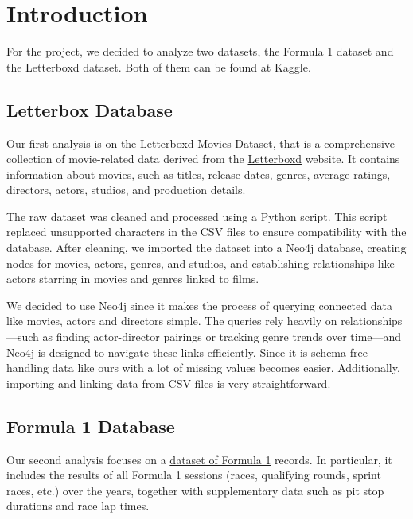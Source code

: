 \documentclass{Configuration_Files/PoliMi3i_thesis}
\begin{document}
\mainmatter %

\chapter{Introduction}

For the project, we decided to analyze two datasets, the Formula 1 dataset and the Letterboxd dataset. Both of them can be found at Kaggle.

\section{Letterbox Database}

Our first analysis is on the \href{https://www.kaggle.com/datasets/gsimonx37/letterboxd}{Letterboxd Movies Dataset}, that is a comprehensive collection of movie-related data derived from the \href{https://letterboxd.com/}{Letterboxd} website. It contains information about movies, such as titles, release dates, genres, average ratings, directors, actors, studios, and production details.

The raw dataset was cleaned and processed using a Python script. This script replaced unsupported characters in the CSV files to ensure compatibility with the database. After cleaning, we imported the dataset into a Neo4j database, creating nodes for movies, actors, genres, and studios, and establishing relationships like actors starring in movies and genres linked to films.

We decided to use Neo4j since it makes the process of querying connected data like movies, actors and directors simple. The queries rely heavily on relationships—such as finding actor-director pairings or tracking genre trends over time—and Neo4j is designed to navigate these links efficiently. Since it is schema-free handling data like ours with a lot of missing values becomes easier. Additionally, importing and linking data from CSV files is very straightforward.

\section{Formula 1 Database}
Our second analysis focuses on a \href{https://www.kaggle.com/datasets/rohanrao/formula-1-world-championship-1950-2020}{dataset of Formula 1} records. In particular, it includes the results of all Formula 1 sessions (races, qualifying rounds, sprint races, etc.) over the years, together with supplementary data such as pit stop durations and race lap times.
\end{document}
